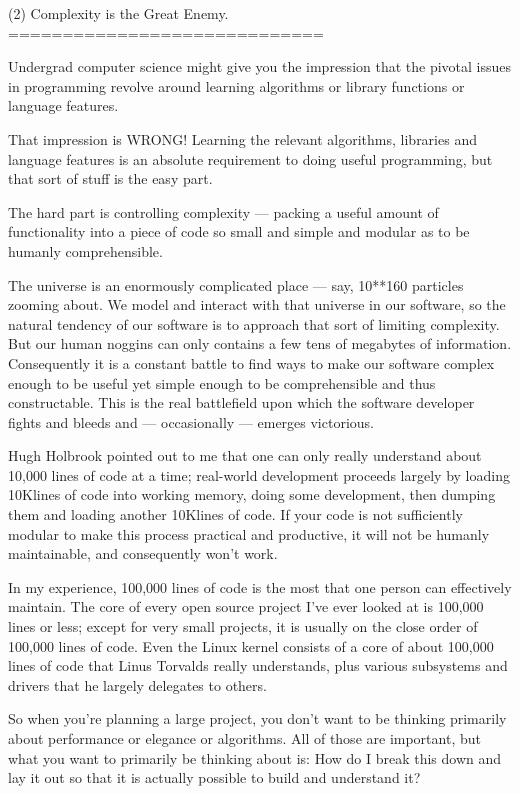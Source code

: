 (2) Complexity is the Great Enemy. 
    ============================= 

    Undergrad computer science might give you the impression that the pivotal issues 
    in programming revolve around learning algorithms or library functions or language 
    features. 

    That impression is WRONG!  Learning the relevant algorithms, libraries and language 
    features is an absolute requirement to doing useful programming, but that sort of 
    stuff is the easy part.  

    The hard part is controlling complexity --- packing a useful amount of functionality 
    into a piece of code so small and simple and modular as to be humanly comprehensible. 

    The universe is an enormously complicated place  --- say, 10**160 particles zooming about. 
    We model and interact with that universe in our software, so the natural tendency 
    of our software is to approach that sort of limiting complexity.  But our human noggins 
    can only contains a few tens of megabytes of information.  Consequently it is a constant 
    battle to find ways to make our software complex enough to be useful yet simple enough 
    to be comprehensible and thus constructable.  This is the real battlefield upon which 
    the software developer fights and bleeds and  --- occasionally  --- emerges victorious. 

    Hugh Holbrook pointed out to me that one can only really understand about 10,000 lines 
    of code at a time;  real-world development proceeds largely by loading 10Klines of code 
    into working memory, doing some development, then dumping them and loading another 10Klines 
    of code.  If your code is not sufficiently modular to make this process practical and 
    productive, it will not be humanly maintainable, and consequently won't work.

    In my experience, 100,000 lines of code is the most that one person can effectively maintain.
    The core of every open source project I've ever looked at is 100,000 lines or less;  except 
    for very small projects, it is usually on the close order of 100,000 lines of code.  Even 
    the Linux kernel consists of a core of about 100,000 lines of code that Linus Torvalds really 
    understands, plus various subsystems and drivers that he largely delegates to others.

    So when you're planning a large project, you don't want to be thinking primarily about 
    performance or elegance or algorithms.  All of those are important, but what you want 
    to primarily be thinking about is:  How do I break this down and lay it out so that it 
    is actually possible to build and understand it?
    

